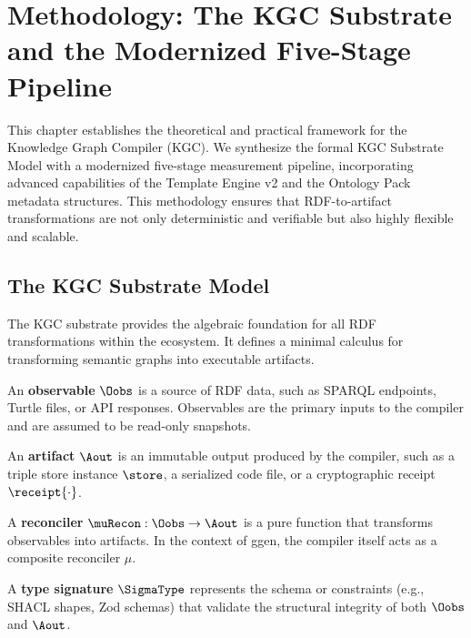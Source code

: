 \chapter{Methodology: The KGC Substrate and the Modernized Five-Stage Pipeline}

This chapter establishes the theoretical and practical framework for the Knowledge Graph Compiler (KGC). We synthesize the formal KGC Substrate Model with a modernized five-stage measurement pipeline, incorporating advanced capabilities of the Template Engine v2 and the Ontology Pack metadata structures. This methodology ensures that RDF-to-artifact transformations are not only deterministic and verifiable but also highly flexible and scalable.

\section{The KGC Substrate Model}

The KGC substrate provides the algebraic foundation for all RDF transformations within the ecosystem. It defines a minimal calculus for transforming semantic graphs into executable artifacts.

\begin{definition}
An \textbf{observable} $\Oobs$ is a source of RDF data, such as SPARQL endpoints, Turtle files, or API responses. Observables are the primary inputs to the compiler and are assumed to be read-only snapshots.
\end{definition}

\begin{definition}
An \textbf{artifact} $\Aout$ is an immutable output produced by the compiler, such as a triple store instance $\store$, a serialized code file, or a cryptographic receipt $\receipt{\cdot}$.
\end{definition}

\begin{definition}
A \textbf{reconciler} $\muRecon : \Oobs \to \Aout$ is a pure function that transforms observables into artifacts. In the context of ggen, the compiler itself acts as a composite reconciler $\mu$.
\end{definition}

\begin{definition}
A \textbf{type signature} $\SigmaType$ represents the schema or constraints (e.g., SHACL shapes, Zod schemas) that validate the structural integrity of both $\Oobs$ and $\Aout$.
\end{definition}

